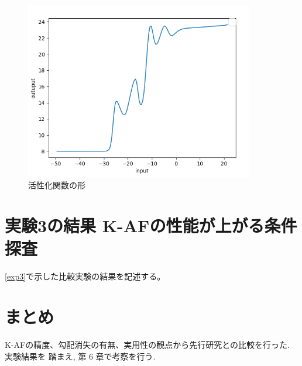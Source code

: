 \begin{figure}[hbtp]
    \begin{center}
        \includegraphics[width=10cm]{asset/boston_0000001_SGDkaiming_normal__non_200_function_2.png}
            \caption{活性化関数の形}
            \label{boston}
    \end{center}
\end{figure}


\section{実験3の結果 K-AFの性能が上がる条件探査}
\label{evo3}
\ref{exp3}で示した比較実験の結果を記述する。

\section{まとめ}

K-AFの精度、勾配消失の有無、実用性の観点から先行研究との比較を行った. 実験結果を
踏まえ, 第 6 章で考察を行う.


